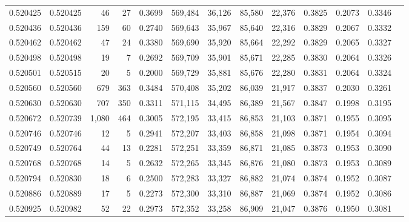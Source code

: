 \begin{tabular}{rrrrrrrrrrrrr}
0.520425 & 0.520425 &    46 &    27 &                                     0.3699 & 569,484 &  36,126 &  85,580 &  22,376 & 0.3825 & 0.2073 & 0.3346 \\
0.520436 & 0.520436 &   159 &    60 &                                     0.2740 & 569,643 &  35,967 &  85,640 &  22,316 & 0.3829 & 0.2067 & 0.3332 \\
0.520462 & 0.520462 &    47 &    24 &                                     0.3380 & 569,690 &  35,920 &  85,664 &  22,292 & 0.3829 & 0.2065 & 0.3327 \\
0.520498 & 0.520498 &    19 &     7 &                                     0.2692 & 569,709 &  35,901 &  85,671 &  22,285 & 0.3830 & 0.2064 & 0.3326 \\
0.520501 & 0.520515 &    20 &     5 &                                     0.2000 & 569,729 &  35,881 &  85,676 &  22,280 & 0.3831 & 0.2064 & 0.3324 \\
0.520560 & 0.520560 &   679 &   363 &                                     0.3484 & 570,408 &  35,202 &  86,039 &  21,917 & 0.3837 & 0.2030 & 0.3261 \\
0.520630 & 0.520630 &   707 &   350 &                                     0.3311 & 571,115 &  34,495 &  86,389 &  21,567 & 0.3847 & 0.1998 & 0.3195 \\
0.520672 & 0.520739 & 1,080 &   464 &                                     0.3005 & 572,195 &  33,415 &  86,853 &  21,103 & 0.3871 & 0.1955 & 0.3095 \\
0.520746 & 0.520746 &    12 &     5 &                                     0.2941 & 572,207 &  33,403 &  86,858 &  21,098 & 0.3871 & 0.1954 & 0.3094 \\
0.520749 & 0.520764 &    44 &    13 &                                     0.2281 & 572,251 &  33,359 &  86,871 &  21,085 & 0.3873 & 0.1953 & 0.3090 \\
0.520768 & 0.520768 &    14 &     5 &                                     0.2632 & 572,265 &  33,345 &  86,876 &  21,080 & 0.3873 & 0.1953 & 0.3089 \\
0.520794 & 0.520830 &    18 &     6 &                                     0.2500 & 572,283 &  33,327 &  86,882 &  21,074 & 0.3874 & 0.1952 & 0.3087 \\
0.520886 & 0.520889 &    17 &     5 &                                     0.2273 & 572,300 &  33,310 &  86,887 &  21,069 & 0.3874 & 0.1952 & 0.3086 \\
0.520925 & 0.520982 &    52 &    22 &                                     0.2973 & 572,352 &  33,258 &  86,909 &  21,047 & 0.3876 & 0.1950 & 0.3081 \\

\end{tabular}
